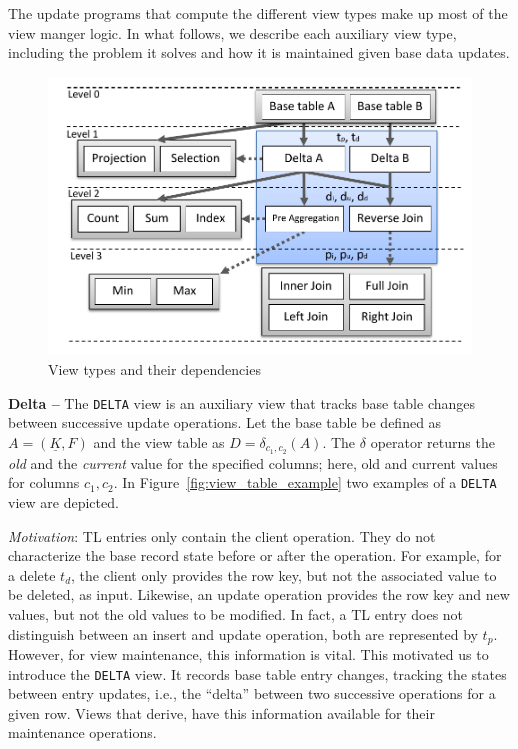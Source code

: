 The update programs that compute the different view types make up most
of the view manger logic. In what follows, we describe each auxiliary
view type, including the problem it solves and how it is maintained
given base data updates.

\begin{figure}
  \centering
    \includegraphics[width=\linewidth]{figures/ViewDependencies}
        \vspace{-5mm}
    \caption{View types and their dependencies}
        \vspace{-5mm}
    \label{fig:view_types}
\end{figure}


\noindent  
\textbf{Delta --} The \texttt{DELTA} view is an auxiliary view that
tracks base table changes between successive update operations.  Let
the base table be defined as $A = (\underline{K},F)$ and the view
table as $D=\delta_{c_1,c_2}(A)$.  The $\delta$ operator returns the
\textit{old} and the \textit{current} value for the specified columns;
here, old and current values for columns $c_1, c_2$. In 
Figure~\ref{fig:view_table_example} two examples of a \texttt{DELTA}
view are depicted.

%

\noindent  
\textit{Motivation}: TL entries only contain the client operation.
They do not characterize the base record state before or after the
operation. For example, for a delete $t_d$, the client only provides
the row key, but not the associated value to be deleted, as input.
Likewise, an update operation provides the row key and new values, but
not the old values to be modified. In fact, a TL entry does not
distinguish between an insert and update operation, both are
represented by $t_p$. However, for view maintenance, this information
is vital. This motivated us to introduce the \texttt{DELTA} view. It
records base table entry changes, tracking the states between entry
updates, i.e., the ``delta'' between two successive operations for a
given row.  Views that derive, have this information available for
their maintenance operations.


